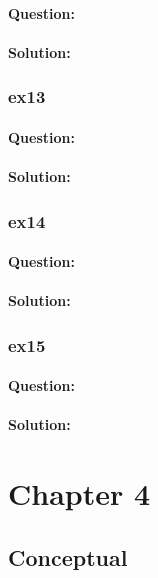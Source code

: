 \documentclass[a4paper,12pt,titlepage]{article} %
\begin{document}
\paragraph{Question:}

\paragraph{Solution:}

\subsubsection{ex13}
\paragraph{Question:}

\paragraph{Solution:}

\subsubsection{ex14}
\paragraph{Question:}

\paragraph{Solution:}

\subsubsection{ex15}
\paragraph{Question:}

\paragraph{Solution:}


\newpage
\section{Chapter 4}
\subsection{Conceptual}
\end{document}

